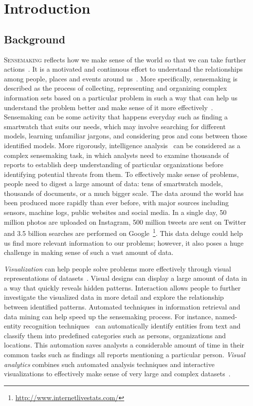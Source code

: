 \chapter{Introduction}
\label{chap:intro}

\graphicspath{{Chapter1/figures/}}

\section{Background}
\lettrine{S}{ensemaking} reflects how we make sense of the world so that we can take further actions~\cite{Snowden2005}. It is a motivated and continuous effort to understand the relationships among people, places and events around us~\cite{Klein2006a}. More specifically, sensemaking is described as the process of collecting, representing and organizing complex information sets based on a particular problem in such a way that can help us understand the problem better and make sense of it more effectively~\cite{Russell2008}. Sensemaking can be some activity that happens everyday such as finding a smartwatch that suits our needs, which may involve searching for different models, learning unfamiliar jargons, and considering pros and cons between those identified models. More rigorously, intelligence analysis~\cite{Heuer1999} can be considered as a complex sensemaking task, in which analysts need to examine thousands of reports to establish deep understanding of particular organizations before identifying potential threats from them. To effectively make sense of problems, people need to digest a large amount of data: tens of smartwatch models, thousands of documents, or a much bigger scale. The data around the world has been produced more rapidly than ever before, with major sources including sensors, machine logs, public websites and social media. In a single day, 50 million photos are uploaded on Instagram, 500 million tweets are sent on Twitter and 3.5 billion searches are performed on Google~\footnote{\url{http://www.internetlivestats.com/}}. This data deluge could help us find more relevant information to our problems; however, it also poses a huge challenge in making sense of such a vast amount of data.

\emph{Visualization} can help people solve problems more effectively through visual representations of datasets~\cite{Munzner2014}. Visual designs can display a large amount of data in a way that quickly reveals hidden patterns. Interaction allows people to further investigate the visualized data in more detail and explore the relationship between identified patterns. Automated techniques in information retrieval and data mining can help speed up the sensemaking process. For instance, named-entity recognition techniques~\cite{Nadeau2007} can automatically identify entities from text and classify them into predefined categories such as persons, organizations and locations. This automation saves analysts a considerable amount of time in their common tasks such as findings all reports mentioning a particular person. \emph{Visual analytics} combines such automated analysis techniques and interactive visualizations to effectively make sense of very large and complex datasets~\cite{Keim2010}.

